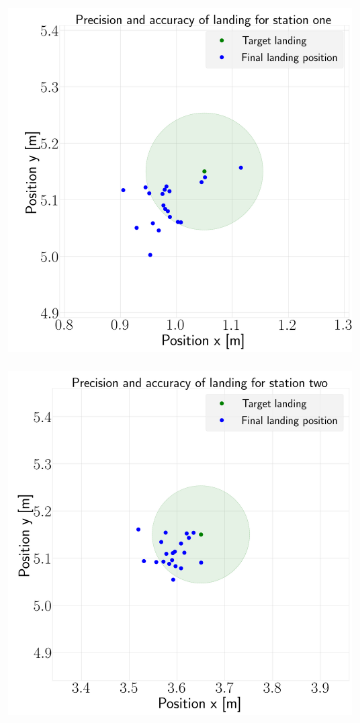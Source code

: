 \documentclass[../Head/report.tex]{subfiles}
\begin{document}
\begin{figure}[H]
    \centering
    \begin{subfigure}[t]{.30\textwidth}
        \centering
        \includegraphics[width=\textwidth]{../Figures/optitrack/landing_test/landing_for_station_one.png}
        \caption{}
        \label{fig:optitrack_vision_based_landing_test1}
    \end{subfigure}
     \hspace{0.2em}
    \begin{subfigure}[t]{.30\textwidth}
        \centering
        \includegraphics[width=\textwidth]{../Figures/optitrack/landing_test/landing_for_station_two.png}

\end{subfigure}
\end{figure}
\end{document}

